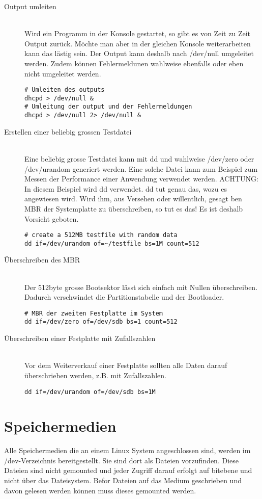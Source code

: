 \documentclass[10pt,paper=a4,final]{scrartcl}
\begin{document}
\begin{description}
\item[Output umleiten] \hfill \\
Wird ein Programm in der Konsole gestartet, so gibt es von Zeit zu Zeit Output zur\"uck. M\"ochte man aber in der gleichen Konsole weiterarbeiten kann das l\"astig sein. Der Output kann deshalb nach /dev/null umgeleitet werden. Zudem k\"onnen Fehlermeldunen wahlweise ebenfalls oder eben nicht umgeleitet werden.
\begin{lstlisting}[frame=single]
# Umleiten des outputs
dhcpd > /dev/null &
# Umleitung der output und der Fehlermeldungen
dhcpd > /dev/null 2> /dev/null &
\end{lstlisting}
\item[Erstellen einer beliebig grossen Testdatei] \hfill \\
Eine beliebig grosse Testdatei kann mit dd und wahlweise /dev/zero oder /dev/urandom generiert werden. Eine solche Datei kann zum Beispiel zum Messen der Performance einer Anwendung verwendet werden. ACHTUNG: In diesem Beispiel wird dd verwendet. dd tut genau das, wozu es angewiesen wird. Wird ihm, aus Versehen oder willentlich, gesagt ben MBR der Systemplatte zu \"uberschreiben, so tut es das! Es ist deshalb Vorsicht geboten.
\begin{lstlisting}[frame=single]
# create a 512MB testfile with random data
dd if=/dev/urandom of=~/testfile bs=1M count=512
\end{lstlisting}
\item[\"Uberschreiben des MBR] \hfill \\
Der 512byte grosse Bootsektor l\"asst sich einfach mit Nullen \"uberschreiben. Dadurch verschwindet die Partitionstabelle und der Bootloader.
\begin{lstlisting}[frame=single]
# MBR der zweiten Festplatte im System
dd if=/dev/zero of=/dev/sdb bs=1 count=512
\end{lstlisting}
\item[\"Uberschreiben einer Festplatte mit Zufallszahlen] \hfill \\
Vor dem Weiterverkauf einer Festplatte sollten alle Daten darauf \"uberschrieben werden, z.B. mit Zufallszahlen.
\begin{lstlisting}[frame=single]
dd if=/dev/urandom of=/dev/sdb bs=1M
\end{lstlisting}
\end{description}

\section{Speichermedien}
Alle Speichermedien die an einem Linux System angeschlossen sind, werden im /dev-Verzeichnis bereitgestellt. Sie sind dort als Dateien vorzufinden. Diese Dateien sind nicht gemounted und jeder Zugriff darauf erfolgt auf bitebene und nicht \"uber das Dateisystem. Befor Dateien auf das Medium geschrieben und davon gelesen werden k\"onnen muss dieses gemounted werden.\\
\end{document}
